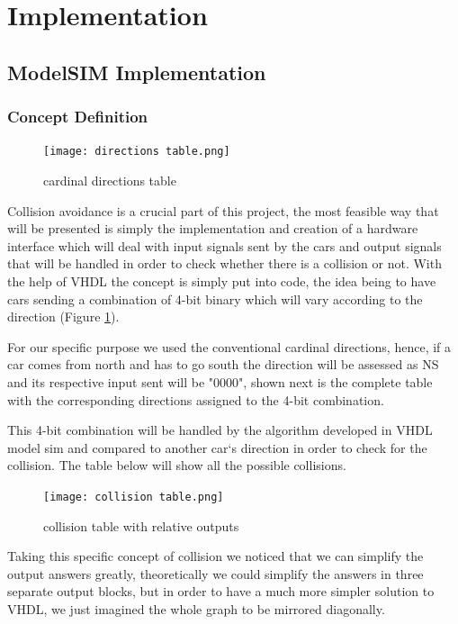 \documentclass[conference]{IEEEtran}
\begin{document}
\section{Implementation}

\subsection{ModelSIM Implementation}

\subsubsection{Concept Definition}

\begin{figure}[h]
    \centerline{\texttt{[image: directions table.png]}}
    \caption{cardinal directions table}
    \label{directions}
\end{figure}

Collision avoidance is a crucial part of this project, the most feasible way that will be presented is simply the implementation and creation of a hardware interface which will deal with input signals sent by the cars and output signals that will be handled in order to check whether there is a collision or not. With the help of VHDL the concept is simply put into code, the idea being to have cars sending a combination of 4-bit binary which will vary according to the direction (Figure \ref{directions}).

For our specific purpose we used the conventional cardinal directions, hence, if a car comes from north and has to go south the direction will be assessed as NS and its respective input sent will be "0000", shown next is the complete table with the corresponding directions assigned to the 4-bit combination.

This 4-bit combination will be handled by the algorithm developed in VHDL model sim and compared to another car`s direction in order to check for the collision. The table below will show all the possible collisions.

\begin{figure}[h]
    \centerline{\texttt{[image: collision table.png]}}
    \caption{collision table with relative outputs}
    \label{table}
\end{figure}

Taking this specific concept of collision we noticed that we can simplify the output answers greatly, theoretically we could simplify the answers in three separate output blocks, but in order to have a much more simpler solution to VHDL, we just imagined the whole graph to be mirrored diagonally.
\end{document}
